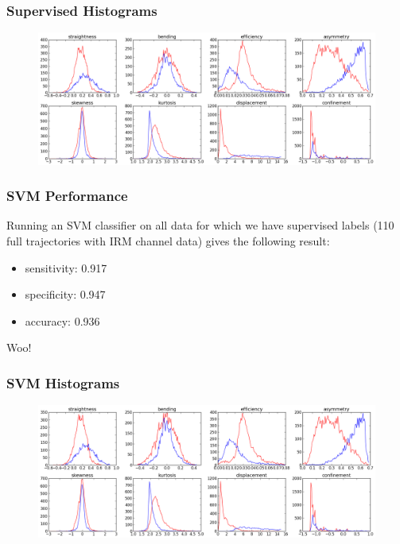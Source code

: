 \documentclass[8pt]{beamer}
\begin{document}
\begin{frame}
  \frametitle{Supervised Histograms}
  \begin{figure}[H]\centering
    \includegraphics[width=\textwidth]{../../out/supervised_hist.png}
  \end{figure}
\end{frame}

\begin{frame}
  \frametitle{SVM Performance}
  Running an SVM classifier on all data for which we have supervised labels (110 full
  trajectories with IRM channel data) gives the following result:
  \begin{itemize}
  \item sensitivity: 0.917
  \item specificity: 0.947
  \item accuracy: 0.936
  \end{itemize}
  Woo!
\end{frame}

\begin{frame}
  \frametitle{SVM Histograms}
  \begin{figure}[H]\centering
    \includegraphics[width=\textwidth]{../../out/svm_hist.png}
  \end{figure}
  
\end{frame}
\end{document}
